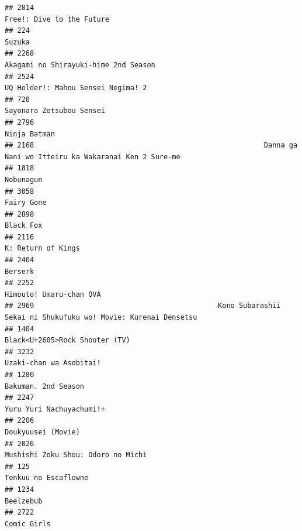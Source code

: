 \documentclass[
]{article}
\begin{document}
\begin{verbatim}
## 2814                                                                                 Free!: Dive to the Future
## 224                                                                                                     Suzuka
## 2268                                                                      Akagami no Shirayuki-hime 2nd Season
## 2524                                                                        UQ Holder!: Mahou Sensei Negima! 2
## 720                                                                                   Sayonara Zetsubou Sensei
## 2796                                                                                              Ninja Batman
## 2168                                                       Danna ga Nani wo Itteiru ka Wakaranai Ken 2 Sure-me
## 1818                                                                                                 Nobunagun
## 3058                                                                                                Fairy Gone
## 2898                                                                                                 Black Fox
## 2116                                                                                        K: Return of Kings
## 2404                                                                                                   Berserk
## 2252                                                                                   Himouto! Umaru-chan OVA
## 2969                                            Kono Subarashii Sekai ni Shukufuku wo! Movie: Kurenai Densetsu
## 1404                                                                            Black<U+2605>Rock Shooter (TV)
## 3232                                                                                   Uzaki-chan wa Asobitai!
## 1280                                                                                       Bakuman. 2nd Season
## 2247                                                                                  Yuru Yuri Nachuyachumi!+
## 2206                                                                                        Doukyuusei (Movie)
## 2026                                                                        Mushishi Zoku Shou: Odoro no Michi
## 125                                                                                       Tenkuu no Escaflowne
## 1234                                                                                                 Beelzebub
## 2722                                                                                               Comic Girls

\end{verbatim}
\end{document}
